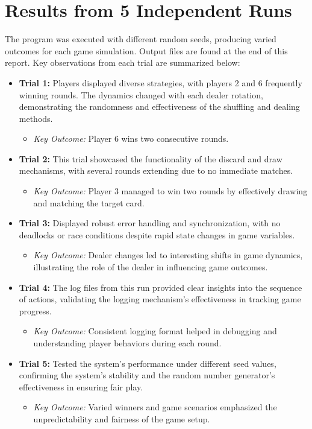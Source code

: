 \documentclass{article}
\begin{document}
\section*{Results from 5 Independent Runs}
The program was executed with different random seeds, producing varied outcomes for each game simulation. Output files are found at the end of this report. Key observations from each trial are summarized below:
\begin{itemize}
    \item \textbf{Trial 1:} Players displayed diverse strategies, with players 2 and 6 frequently winning rounds. The dynamics changed with each dealer rotation, demonstrating the randomness and effectiveness of the shuffling and dealing methods.
    \begin{itemize}
        \item \textit{Key Outcome:} Player 6 wins two consecutive rounds.
    \end{itemize}
    \item \textbf{Trial 2:} This trial showcased the functionality of the discard and draw mechanisms, with several rounds extending due to no immediate matches.
    \begin{itemize}
        \item \textit{Key Outcome:} Player 3 managed to win two rounds by effectively drawing and matching the target card.
    \end{itemize}
    \item \textbf{Trial 3:} Displayed robust error handling and synchronization, with no deadlocks or race conditions despite rapid state changes in game variables.
    \begin{itemize}
        \item \textit{Key Outcome:} Dealer changes led to interesting shifts in game dynamics, illustrating the role of the dealer in influencing game outcomes.
    \end{itemize}
    \item \textbf{Trial 4:} The log files from this run provided clear insights into the sequence of actions, validating the logging mechanism's effectiveness in tracking game progress.
    \begin{itemize}
        \item \textit{Key Outcome:} Consistent logging format helped in debugging and understanding player behaviors during each round.
    \end{itemize}
    \item \textbf{Trial 5:} Tested the system's performance under different seed values, confirming the system's stability and the random number generator's effectiveness in ensuring fair play.
    \begin{itemize}
        \item \textit{Key Outcome:} Varied winners and game scenarios emphasized the unpredictability and fairness of the game setup.
    \end{itemize}
\end{itemize}
\end{document}

